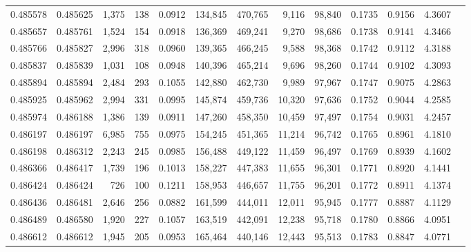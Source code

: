\begin{tabular}{rrrrrrrrrrrrr}
0.485578 & 0.485625 & 1,375 &   138 &                                     0.0912 & 134,845 & 470,765 &   9,116 &  98,840 & 0.1735 & 0.9156 & 4.3607 \\
0.485657 & 0.485761 & 1,524 &   154 &                                     0.0918 & 136,369 & 469,241 &   9,270 &  98,686 & 0.1738 & 0.9141 & 4.3466 \\
0.485766 & 0.485827 & 2,996 &   318 &                                     0.0960 & 139,365 & 466,245 &   9,588 &  98,368 & 0.1742 & 0.9112 & 4.3188 \\
0.485837 & 0.485839 & 1,031 &   108 &                                     0.0948 & 140,396 & 465,214 &   9,696 &  98,260 & 0.1744 & 0.9102 & 4.3093 \\
0.485894 & 0.485894 & 2,484 &   293 &                                     0.1055 & 142,880 & 462,730 &   9,989 &  97,967 & 0.1747 & 0.9075 & 4.2863 \\
0.485925 & 0.485962 & 2,994 &   331 &                                     0.0995 & 145,874 & 459,736 &  10,320 &  97,636 & 0.1752 & 0.9044 & 4.2585 \\
0.485974 & 0.486188 & 1,386 &   139 &                                     0.0911 & 147,260 & 458,350 &  10,459 &  97,497 & 0.1754 & 0.9031 & 4.2457 \\
0.486197 & 0.486197 & 6,985 &   755 &                                     0.0975 & 154,245 & 451,365 &  11,214 &  96,742 & 0.1765 & 0.8961 & 4.1810 \\
0.486198 & 0.486312 & 2,243 &   245 &                                     0.0985 & 156,488 & 449,122 &  11,459 &  96,497 & 0.1769 & 0.8939 & 4.1602 \\
0.486366 & 0.486417 & 1,739 &   196 &                                     0.1013 & 158,227 & 447,383 &  11,655 &  96,301 & 0.1771 & 0.8920 & 4.1441 \\
0.486424 & 0.486424 &   726 &   100 &                                     0.1211 & 158,953 & 446,657 &  11,755 &  96,201 & 0.1772 & 0.8911 & 4.1374 \\
0.486436 & 0.486481 & 2,646 &   256 &                                     0.0882 & 161,599 & 444,011 &  12,011 &  95,945 & 0.1777 & 0.8887 & 4.1129 \\
0.486489 & 0.486580 & 1,920 &   227 &                                     0.1057 & 163,519 & 442,091 &  12,238 &  95,718 & 0.1780 & 0.8866 & 4.0951 \\
0.486612 & 0.486612 & 1,945 &   205 &                                     0.0953 & 165,464 & 440,146 &  12,443 &  95,513 & 0.1783 & 0.8847 & 4.0771 \\

\end{tabular}
